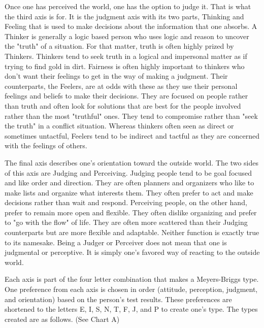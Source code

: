 Once one has perceived the world, one has the option to judge it. That is what the third axis is for. It is the judgment axis with its two parts, Thinking and Feeling that is used to make decisions about the information that one absorbs. A Thinker is generally a logic based person who uses logic and reason to uncover the "truth" of a situation. For that matter, truth is often highly prized by Thinkers. Thinkers tend to seek truth in a logical and impersonal matter as if trying to find gold in dirt. Fairness is often highly important to thinkers who don't want their feelings to get in the way of making a judgment. Their counterparts, the Feelers, are at odds with these as they use their personal feelings and beliefs to make their decisions. They are focused on people rather than truth and often look for solutions that are best for the people involved rather than the most "truthful" ones. They tend to compromise rather than "seek the truth" in a conflict situation. Whereas thinkers often seen as direct or sometimes untactful, Feelers tend to be indirect and tactful as they are concerned with the feelings of others.

The final axis describes one's orientation toward the outside world. The two sides of this axis are Judging and Perceiving. Judging people tend to be goal focused and like order and direction. They are often planners and organizers who like to make lists and organize what interests them. They often prefer to act and make decisions rather than wait and respond. Perceiving people, on the other hand, prefer to remain more open and flexible. They often dislike organizing and prefer to "go with the flow" of life. They are often more scattered than their Judging counterparts but are more flexible and adaptable.  Neither function is exactly true to its namesake. Being a Judger or Perceiver does not mean that one is judgmental or perceptive. It is simply one's favored way of reacting to the outside world.

	Each axis is part of the four letter combination that makes a Meyers-Briggs type. One preference from each axis is chosen in order (attitude, perception, judgment, and orientation) based on the person's test results. These preferences are shortened to the letters E, I, S, N, T, F, J, and P to create one's type. The types created are as follows. (See Chart A)
	
